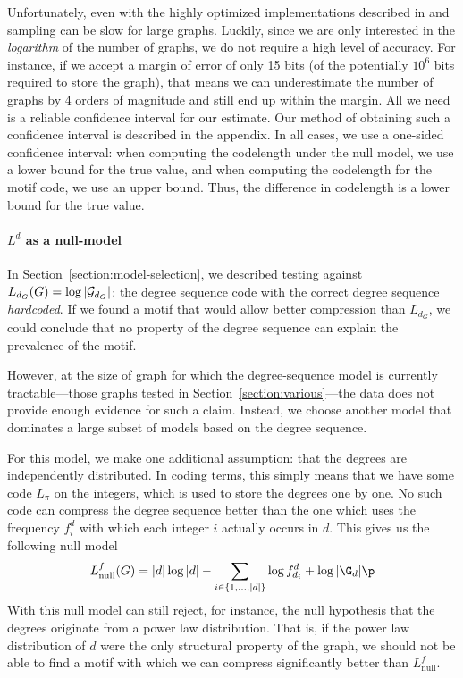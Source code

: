 
Unfortunately, even with the highly optimized implementations described in \cite{charo2010efficient} and \cite{kim2012constructing} sampling can be slow for large graphs. Luckily, since we are only interested in the \emph{logarithm} of the number of graphs, we do not require a high level of accuracy. For instance, if we accept a margin of error of only 15 bits (of the potentially $10^6$ bits required to store the graph), that means we can underestimate the number of graphs by 4 orders of magnitude and still end up within the margin. All we need is a reliable confidence interval for our estimate. Our method of obtaining such a confidence interval is described in the appendix. In all cases, we use a one-sided confidence interval: when computing the codelength under the null model, we use a lower bound for the true value, and when computing the codelength for the motif code, we use an upper bound. Thus, the difference in codelength is a lower bound for the true value.

\paragraph{$L^d$ as a null-model}

In Section~\ref{section:model-selection}, we described testing against $L_{d_G}(G) = \log |{\cal G}_{d_G}|$: the degree sequence code with the correct degree sequence \emph{hardcoded}. If we found a motif that would allow better compression than $L_{d_G}$, we could conclude that no property of the degree sequence can explain the prevalence of the motif. 

However, at the size of graph for which the degree-sequence model is currently tractable---those graphs tested in Section~\ref{section:various}---the data does not provide enough evidence for such a claim. Instead, we choose another model that dominates a large subset of models based on the degree sequence.

For this model, we make one additional assumption: that the degrees are independently distributed. In coding terms, this simply means that we have some code $L_\pi$ on the integers, which is used to store the degrees one by one. No such code can compress the degree sequence better than the one which uses the frequency $f^d_i$ with which each integer $i$ actually occurs in $d$. This gives us the following null model
\[
L^f_\text{null}(G) = |d| \log |d| - \sum_{i \in \{1, \ldots, |d|\}} \log f^d_{d_i} + \log |\G_d| \p  
\] 
With this null model can still reject, for instance, the null hypothesis that the degrees originate from a power law distribution. That is, if the power law distribution of $d$ were the only structural property of the graph, we should not be able to find a motif with which we can compress significantly better than $L^f_\text{null}$.

